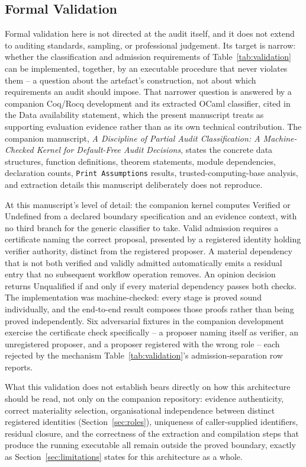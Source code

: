 \documentclass[11pt,a4paper]{article}
\theoremstyle{definition}
\theoremstyle{remark}
\begin{document}
\subsection{Formal Validation}
\label{sec:coq}

Formal validation here is not directed at the audit itself, and it does not extend to auditing standards, sampling, or professional judgement. Its target is narrow: whether the classification and admission requirements of Table~\ref{tab:validation} can be implemented, together, by an executable procedure that never violates them -- a question about the artefact's construction, not about which requirements an audit should impose. That narrower question is answered by a companion Coq/Rocq development and its extracted OCaml classifier, cited in the Data availability statement, which the present manuscript treats as supporting evaluation evidence rather than as its own technical contribution. The companion manuscript, \emph{A Discipline of Partial Audit Classification: A Machine-Checked Kernel for Default-Free Audit Decisions}, states the concrete data structures, function definitions, theorem statements, module dependencies, declaration counts, \texttt{Print Assumptions} results, trusted-computing-base analysis, and extraction details this manuscript deliberately does not reproduce.

At this manuscript's level of detail: the companion kernel computes \textsf{Verified} or \textsf{Undefined} from a declared boundary specification and an evidence context, with no third branch for the generic classifier to take. Valid admission requires a certificate naming the correct proposal, presented by a registered identity holding verifier authority, distinct from the registered proposer. A material dependency that is not both verified and validly admitted automatically emits a residual entry that no subsequent workflow operation removes. An opinion decision returns \textsf{Unqualified} if and only if every material dependency passes both checks. The implementation was machine-checked: every stage is proved sound individually, and the end-to-end result composes those proofs rather than being proved independently. Six adversarial fixtures in the companion development exercise the certificate check specifically -- a proposer naming itself as verifier, an unregistered proposer, and a proposer registered with the wrong role -- each rejected by the mechanism Table~\ref{tab:validation}'s admission-separation row reports.

What this validation does not establish bears directly on how this architecture should be read, not only on the companion repository: evidence authenticity, correct materiality selection, organisational independence between distinct registered identities (Section~\ref{sec:roles}), uniqueness of caller-supplied identifiers, residual closure, and the correctness of the extraction and compilation steps that produce the running executable all remain outside the proved boundary, exactly as Section~\ref{sec:limitations} states for this architecture as a whole.
\end{document}
